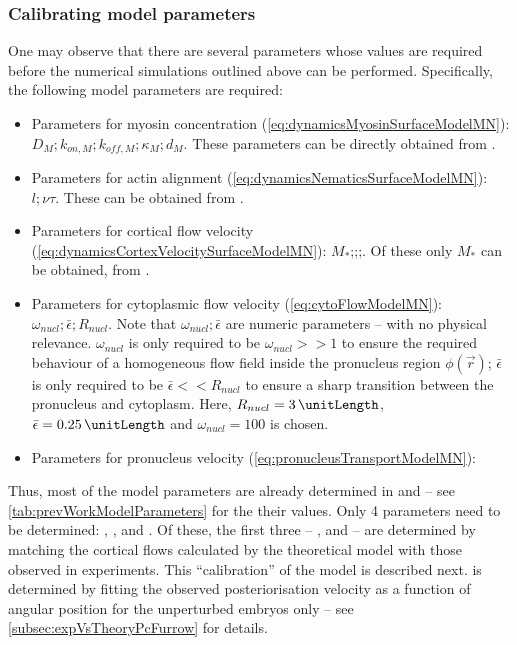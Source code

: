 \subsubsection{Calibrating model parameters}
One may observe that there are several parameters whose values are required before the numerical simulations outlined above can be performed. Specifically, the following model parameters are required: 
\begin{itemize}
    \item Parameters for myosin concentration (\autoref{eq:dynamicsMyosinSurfaceModelMN}): $D_M; k_{on,M}; k_{off,M}; \kappa_M; d_M$. These parameters can be directly obtained from \cite{gross2019guiding}.
    \item Parameters for actin alignment (\autoref{eq:dynamicsNematicsSurfaceModelMN}): $l;\nu\tau$. These can be obtained from \cite{reymann2016cortical}.
    \item Parameters for cortical flow velocity (\autoref{eq:dynamicsCortexVelocitySurfaceModelMN}): $M_*$;\hydrodynamicLength;\nematicLength;\activeRelaxLength. Of these only $M_*$ can be obtained, from \cite{gross2019guiding}.
    \item Parameters for cytoplasmic flow velocity (\autoref{eq:cytoFlowModelMN}): $\omega_{nucl}; \bar{\epsilon}; R_{nucl}$. Note that $\omega_{nucl}; \bar{\epsilon}$ are numeric parameters -- with no physical relevance. $\omega_{nucl}$ is only required to be $\omega_{nucl} >> 1$ to ensure the required behaviour of a homogeneous flow field inside the pronucleus region $\phi(\vec{r})$; $\bar{\epsilon}$ is only required to be $\bar{\epsilon} << R_{nucl}$ to ensure a sharp transition between the pronucleus and cytoplasm. Here, $R_{nucl} = \SI{3}{\unitLength}$, $\bar{\epsilon} = \SI{0.25}{\unitLength}$ and $\omega_{nucl} = \num{100}$ is chosen.
    \item Parameters for pronucleus velocity (\autoref{eq:pronucleusTransportModelMN}): \dragCoefficient
\end{itemize}
Thus, most of the model parameters are already determined in \citep{gross2019guiding} and \citep{reymann2016cortical} -- see \autoref{tab:prevWorkModelParameters} for the their values. Only \num{4} parameters need to be determined: \hydrodynamicLength, \nematicLength, \activeRelaxLength and \dragCoefficient. Of these, the first three -- \hydrodynamicLength, \nematicLength and \activeRelaxLength -- are determined by matching the cortical flows calculated by the theoretical model with those observed in experiments. This \enquote{calibration} of the model is described next. \dragCoefficient is determined by fitting the observed posteriorisation velocity as a function of angular position for the unperturbed embryos only -- see \autoref{subsec:expVsTheoryPcFurrow} for details.

